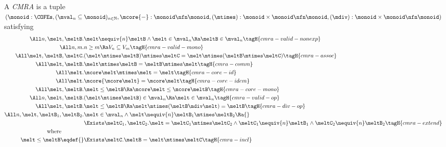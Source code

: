 \begin{defn}
  A \emph{CMRA} is a tuple $(\monoid : \COFEs, (\mval_n \subseteq \monoid)_{n \in \mathbb{N}}, \mcore{-}: \monoid \nfn \monoid, (\mtimes) : \monoid \times \monoid \nfn \monoid, (\mdiv) : \monoid \times \monoid \nfn \monoid)$ satisfying
  \begin{align*}
    \All n, \melt, \meltB.& \melt \nequiv{n} \meltB \land \melt\in\mval_n \Ra \meltB\in\mval_n \tagH{cmra-valid-nonexp} \\
    \All n, m.& n \geq m \Ra V_n \subseteq V_m \tagH{cmra-valid-mono} \\
    \All \melt, \meltB, \meltC.& (\melt \mtimes \meltB) \mtimes \meltC = \melt \mtimes (\meltB \mtimes \meltC) \tagH{cmra-assoc} \\
    \All \melt, \meltB.& \melt \mtimes \meltB = \meltB \mtimes \melt \tagH{cmra-comm} \\
    \All \melt.& \mcore\melt \mtimes \melt = \melt \tagH{cmra-core-id} \\
    \All \melt.& \mcore{\mcore\melt} = \mcore\melt \tagH{cmra-core-idem} \\
    \All \melt, \meltB.& \melt \leq \meltB \Ra \mcore\melt \leq \mcore\meltB \tagH{cmra-core-mono} \\
    \All n, \melt, \meltB.& (\melt \mtimes \meltB) \in \mval_n \Ra \melt \in \mval_n \tagH{cmra-valid-op} \\
    \All \melt, \meltB.& \melt \leq \meltB \Ra \melt \mtimes (\meltB \mdiv \melt) = \meltB \tagH{cmra-div-op} \\
    \All n, \melt, \meltB_1, \meltB_2.& \omit\rlap{$\melt \in \mval_n \land \melt \nequiv{n} \meltB_1 \mtimes \meltB_2 \Ra {}$} \\
    &\Exists \meltC_1, \meltC_2. \melt = \meltC_1 \mtimes \meltC_2 \land \meltC_1 \nequiv{n} \meltB_1 \land \meltC_2 \nequiv{n} \meltB_2 \tagH{cmra-extend} \\
    \text{where}\qquad\qquad\\
    \melt \leq \meltB \eqdef{}& \Exists \meltC. \meltB = \melt \mtimes \meltC \tagH{cmra-incl}
  \end{align*}
\end{defn}


